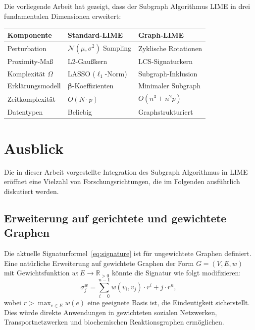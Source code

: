 ﻿\documentclass[a4paper,12pt]{article}
\theoremstyle{definition}
\begin{document}
Die vorliegende Arbeit hat gezeigt, dass der Subgraph Algorithmus \citep{Epp2026}
LIME \citep{Ribeiro2016} in drei fundamentalen Dimensionen erweitert:

\begin{center}
\begin{tabular}{@{}lll@{}}
  \toprule
  Komponente & Standard-LIME & Graph-LIME \\
  \midrule
  Perturbation & $\mathcal{N}(\mu, \sigma^2)$ Sampling & Zyklische Rotationen \\
  Proximity-Maß & L2-Gaußkern & LCS-Signaturkern \\
  Komplexität $\Omega$ & LASSO ($\ell_1$-Norm) & Subgraph-Inklusion \\
  Erklärungsmodell & $\boldsymbol{\beta}$-Koeffizienten & Minimaler Subgraph \\
  Zeitkomplexität & $O(N \cdot p)$ & $O(n^3 + n^2 p)$ \\
  Datentypen & Beliebig & Graphstrukturiert \\
  \bottomrule
\end{tabular}
\end{center}

\section{Ausblick}

Die in dieser Arbeit vorgestellte Integration des Subgraph Algorithmus in LIME
eröffnet eine Vielzahl von Forschungsrichtungen, die im Folgenden ausführlich
diskutiert werden.

\subsection{Erweiterung auf gerichtete und gewichtete Graphen}

Die aktuelle Signaturformel~\eqref{eq:signature} ist für ungewichtete Graphen
definiert. Eine natürliche Erweiterung auf gewichtete Graphen der Form
$G = (V, E, w)$ mit Gewichtsfunktion $w: E \to \mathbb{R}_{>0}$ könnte
die Signatur wie folgt modifizieren:
\[
  \sigma_j^w = \sum_{i=0}^{n-1} w(v_i, v_j) \cdot r^i + j \cdot r^n,
\]
wobei $r > \max_{e \in E} w(e)$ eine geeignete Basis ist, die Eindeutigkeit
sicherstellt.
Dies würde direkte Anwendungen in gewichteten sozialen Netzwerken,
Transportnetzwerken und biochemischen Reaktionsgraphen ermöglichen.
\end{document}
